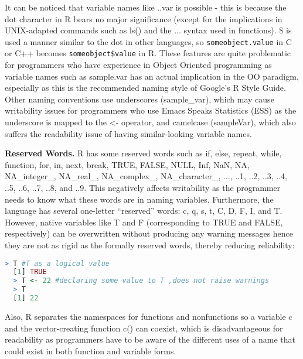 \documentclass[12pt]{article}
\begin{document}
It can be noticed that variable names like ..var is possible - this is because the dot character in R bears no major significance (except for the implications in UNIX-adapted commands such as ls() and the ... syntax used in functions). \$ is used a manner similar to the dot in other languages, so \texttt{someobject.value} in C or C++ becomes \texttt{someobject\$value} in R. These features are quite problematic for programmers who have experience in Object Oriented programming as variable names such as sample.var has an actual implication in the OO paradigm, especially as this is the recommended naming style of Google's R Style Guide. Other naming conventions use underscores (sample\_var), which may cause writability issues for programmers who use Emacs Speaks Statistics (ESS) as the underscore is mapped to the <- operator, and camelcase (sampleVar), which also suffers the readability issue of having similar-looking variable names.

\textbf{Reserved Words.} R has some reserved words such as if, else, repeat, while, function, for, in, next, break, TRUE, FALSE, NULL, Inf, NaN, NA, NA\_integer\_, NA\_real\_, NA\_complex\_, NA\_character\_, ..., ..1, ..2, ..3, ..4, ..5, ..6, ..7, ..8, and ..9. This negatively affects writability as the programmer needs to know what these words are in naming variables. Furthermore, the language has several one-letter ``reserved'' words: c, q, s, t, C, D, F, I, and T. However, native variables like T and F (corresponding to TRUE and FALSE, respectively) can be overwritten without producing any warning messages hence they are not as rigid as the formally reserved words, thereby reducing reliability:

\begin{lstlisting}[language=R ]
  > T #T as a logical value
  [1] TRUE
  > T <- 22 #declaring some value to T ,does not raise warnings
  > T
  [1] 22
\end{lstlisting}

Also, R separates the namespaces for functions and nonfunctions so a variable c and the vector-creating function c() can coexist, which is disadvantageous for readability as programmers have to be aware of the different uses of a name that could exist in both function and variable forms.
\end{document}
